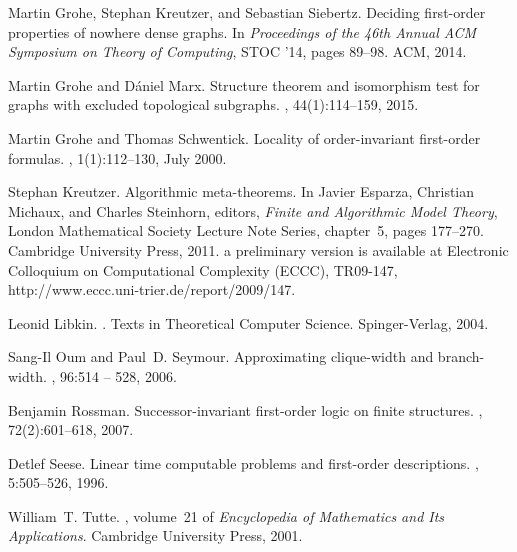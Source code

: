 \documentclass[12pt]{amsart}
\begin{document}
\begin{thebibliography}{10}
Martin Grohe, Stephan Kreutzer, and Sebastian Siebertz.
\newblock Deciding first-order properties of nowhere dense graphs.
\newblock In {\em Proceedings of the 46th Annual ACM Symposium on Theory of
  Computing}, STOC '14, pages 89--98. ACM, 2014.

Martin Grohe and Dániel Marx.
\newblock Structure theorem and isomorphism test for graphs with excluded
  topological subgraphs.
, 44(1):114--159, 2015.

Martin Grohe and Thomas Schwentick.
\newblock Locality of order-invariant first-order formulas.
, 1(1):112--130, July 2000.

Stephan Kreutzer.
\newblock Algorithmic meta-theorems.
\newblock In Javier Esparza, Christian Michaux, and Charles Steinhorn, editors,
  {\em Finite and Algorithmic Model Theory}, London Mathematical Society
  Lecture Note Series, chapter~5, pages 177--270. Cambridge University Press,
  2011.
\newblock a preliminary version is available at Electronic Colloquium on
  Computational Complexity (ECCC), TR09-147,
  http://www.eccc.uni-trier.de/report/2009/147.

Leonid Libkin.
.
\newblock Texts in Theoretical Computer Science. Spinger-Verlag, 2004.

Sang-Il Oum and Paul~D. Seymour.
\newblock Approximating clique-width and branch-width.
, 96:514 -- 528, 2006.

Benjamin Rossman.
\newblock Successor-invariant first-order logic on finite structures.
, 72(2):601--618, 2007.

Detlef Seese.
\newblock Linear time computable problems and first-order descriptions.
, 5:505--526,
  1996.

William~T. Tutte.
, volume~21 of {\em Encyclopedia of Mathematics and
  Its Applications}.
\newblock Cambridge University Press, 2001.

\end{thebibliography}
\end{document}
